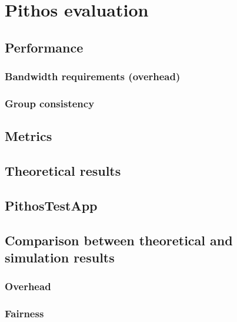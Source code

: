 \chapter{Pithos evaluation}
    \label{chp:EVALUATION}

    \section{Performance}

    \subsection{Bandwidth requirements (overhead)}

        \subsection{Group consistency}

    \section{Metrics}

    \section{Theoretical results}

    \section{PithosTestApp}

    \section{Comparison between theoretical and simulation results}

        \subsection{Overhead}
        \subsection{Fairness}
